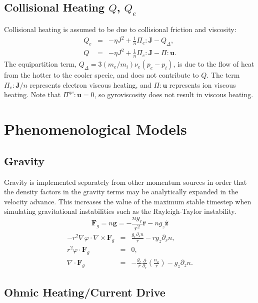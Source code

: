 \documentclass[draft]{book}
\renewcommand{\vec}[1]{\ensuremath{\mathbf{#1}}}
\newcommand{\tensor}[1]{\mathsf{#1}}
\newcommand{\tor}{\varphi}              %
\renewcommand{\u}{\vec{u}}
\newcommand{\F}{\vec{F}}
\renewcommand{\j}{\vec{J}}
\newcommand{\g}{\vec{g}}
\renewcommand{\P}{\tensor{\Pi}}
\newcommand{\grad}[1]{\nabla #1}
\renewcommand{\div}[1]{\nabla \cdot #1}
\newcommand{\curl}[1]{\nabla \times #1}
\newcommand{\uvec}[1]{\ensuremath{\vec{\hat{#1}}}}
\begin{document}
\subsection{Collisional Heating $Q$, $Q_e$}

Collisional heating is assumed to be due to collisional friction and
viscosity:
\begin{eqnarray*}
  Q_e & = & - \eta J^2 + \frac{1}{n} \P_e : \j - Q_\Delta,\\
  Q   & = & - \eta J^2 + \frac{1}{n} \P_e : \j - \P : \u.
\end{eqnarray*}
The equipartition term, $Q_\Delta = 3 (m_e/m_i) \nu_e (p_e - p_i)$, is
due to the flow of heat from the hotter to the cooler specie, and does
not contribute to $Q$.  The term $\P_e : \j / n$ represents electron
viscous heating, and $\P : \u$ represents ion viscous heating.  Note
that $\P^{gv} : \u = 0$, so gyroviscosity does not result in viscous
heating.


\section{Phenomenological Models \label{sec:phenom_models}}

\subsection{Gravity}

Gravity is implemented separately from other momentum sources in order
that the density factors in the gravity terms may be analytically
expanded in the velocity advance.  This increases the value of the
maximum stable timestep when simulating gravitational instabilities
such as the Rayleigh-Taylor instability.
\begin{equation}
  \F_g = n \g = -\frac{n g_r}{r^2}\uvec{r} - n g_z \uvec{z}
\end{equation}
\begin{eqnarray*}
  -r^2 \grad \tor \cdot \curl \F_g & = & \frac{g_r \partial_z n}{r} 
  - r g_z \partial_r n,
  \\
  r^2 \tor \cdot \F_g & = & 0,
  \\
  \div{\F_g} & = & - \frac{g_r}{r} \frac{\partial}{\partial_r} \left(
  \frac{n_x}{r} \right) - g_z \partial_z n.
\end{eqnarray*}

\subsection{Ohmic Heating/Current Drive}
\end{document}
